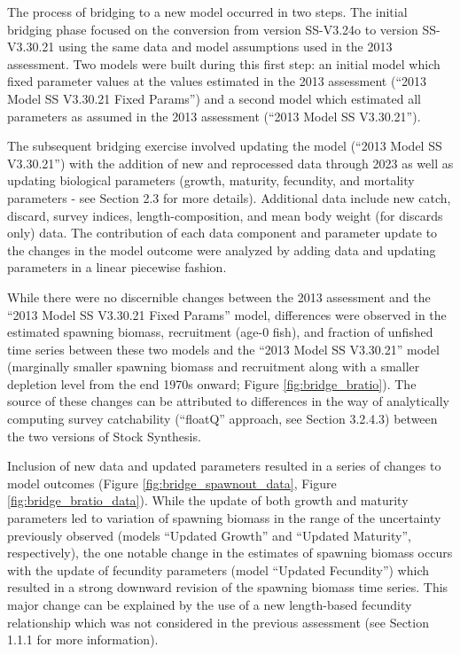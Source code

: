 \documentclass[11pt,
  english,
  letterpaper,
]{article}
\begin{document}
The process of bridging to a new model occurred in two steps. The initial bridging phase focused on the conversion from version SS-V3.24o to version SS-V3.30.21 using the same data and model assumptions used in the 2013 assessment. Two models were built during this first step: an initial model which fixed parameter values at the values estimated in the 2013 assessment (``2013 Model SS V3.30.21 Fixed Params'') and a second model which estimated all parameters as assumed in the 2013 assessment (``2013 Model SS V3.30.21'').

The subsequent bridging exercise involved updating the model (``2013 Model SS V3.30.21'') with the addition of new and reprocessed data through 2023 as well as updating biological parameters (growth, maturity, fecundity, and mortality parameters - see Section 2.3 for more details). Additional data include new catch, discard, survey indices, length-composition, and mean body weight (for discards only) data. The contribution of each data component and parameter update to the changes in the model outcome were analyzed by adding data and updating parameters in a linear piecewise fashion.

While there were no discernible changes between the 2013 assessment and the ``2013 Model SS V3.30.21 Fixed Params'' model, differences were observed in the estimated spawning biomass, recruitment (age-0 fish), and fraction of unfished time series between these two models and the ``2013 Model SS V3.30.21'' model (marginally smaller spawning biomass and recruitment along with a smaller depletion level from the end 1970s onward; Figure \ref{fig:bridge_bratio}). The source of these changes can be attributed to differences in the way of analytically computing survey catchability (``floatQ'' approach, see Section 3.2.4.3) between the two versions of Stock Synthesis.

Inclusion of new data and updated parameters resulted in a series of changes to model outcomes (Figure \ref{fig:bridge_spawnout_data}, Figure \ref{fig:bridge_bratio_data}). While the update of both growth and maturity parameters led to variation of spawning biomass in the range of the uncertainty previously observed (models ``Updated Growth'' and ``Updated Maturity'', respectively), the one notable change in the estimates of spawning biomass occurs with the update of fecundity parameters (model ``Updated Fecundity'') which resulted in a strong downward revision of the spawning biomass time series. This major change can be explained by the use of a new length-based fecundity relationship which was not considered in the previous assessment (see Section 1.1.1 for more information).
\end{document}
